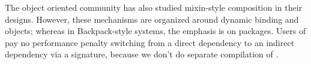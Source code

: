 The object oriented community has also studied mixin-style composition
in their designs.  However, these mechanisms are organized around
dynamic binding and objects; whereas in Backpack-style systems,
the emphasis is on packages.  Users of \Backpack{} pay no performance
penalty switching from a direct dependency to an indirect dependency
via a signature, because we don't do separate compilation of \Backpack{}.








